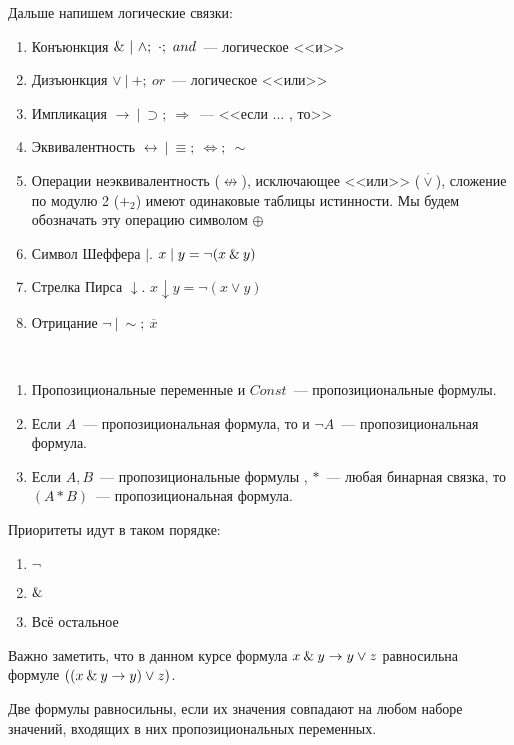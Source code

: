 \documentclass[main]{subfiles}
\begin{document}
Дальше напишем логические связки:
\begin{enumerate}
    \item Конъюнкция $\and\ |\ \land;\ \cdot;\ and $~--- логическое <<и>>
    \item Дизъюнкция $\lor\ |\ +;\ or$~---  логическое <<или>>
    \item Импликация $\to\ |\ \supset;\ \Rightarrow$~--- <<если ... , то>>
    \item Эквивалентность $\leftrightarrow\ |\ \equiv;\ \Leftrightarrow;\ \sim$
    \item Операции неэквивалентность ($\not\leftrightarrow$), исключающее <<или>> ($\stackrel{\cdot}{\lor}$), сложение по модулю 2 ($+_2$) имеют одинаковые таблицы истинности. Мы будем обозначать эту операцию символом $\oplus$
    \item Символ Шеффера $ \mid$.   $x\mid y = \lnot(x\mathbin{\&} y)$
    \item Стрелка Пирса $\downarrow$.   $x\downarrow y = \lnot(x\lor y)$
    \item Отрицание $\lnot\ |\ \sim;\ \overline{x}$
\end{enumerate}
\begin{definition}
    \

    \begin{enumerate}
        \item Пропозициональные переменные и $Const$~--- пропозициональные формулы.
        \item Если $A$~--- пропозициональная формула, то и $\lnot A$~--- пропозициональная формула.
        \item Если $A, B$~--- пропозициональные формулы , $*$~--- любая бинарная связка, то $(A * B)$~--- пропозициональная формула.
    \end{enumerate}
\end{definition}
Приоритеты идут в таком порядке:
\begin{enumerate}
    \item $\lnot$
    \item $\mathbin{\&}$
    \item Всё остальное
\end{enumerate}
\begin{remark}
    Важно заметить, что в данном курсе формула $x\mathbin{\&} y \to y\lor z$ равносильна формуле $((x\mathbin{\&} y \to y) \lor z)$.
\end{remark}
\begin{definition}
    Две формулы равносильны, если их значения совпадают на любом наборе значений,
    входящих в них пропозициональных переменных.
\end{definition}
\end{document}
